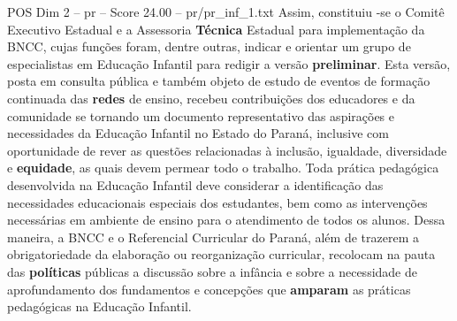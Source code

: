 \begin{textsample}{POS Dim 2 – pr – Score 24.00 – pr/pr\_inf\_1.txt}
Assim, constituiu -se o Comitê Executivo Estadual e a Assessoria \textbf{Técnica} Estadual para implementação da BNCC, cujas funções foram, dentre outras, indicar e orientar um grupo de especialistas em Educação Infantil para redigir a versão \textbf{preliminar}.
Esta versão, posta em consulta pública e também objeto de estudo de eventos de formação continuada das \textbf{redes} de ensino, recebeu contribuições dos educadores e da comunidade se tornando um documento representativo das aspirações e necessidades da Educação Infantil no Estado do Paraná, inclusive com oportunidade de rever as questões relacionadas à inclusão, igualdade, diversidade e \textbf{equidade}, as quais devem permear todo o trabalho.
Toda prática pedagógica desenvolvida na Educação Infantil deve considerar a identificação das necessidades educacionais especiais dos estudantes, bem como as intervenções necessárias em ambiente de ensino para o atendimento de todos os alunos.
Dessa maneira, a BNCC e o Referencial Curricular do Paraná, além de trazerem a obrigatoriedade da elaboração ou reorganização curricular, recolocam na pauta das \textbf{políticas} públicas a discussão sobre a infância e sobre a necessidade de aprofundamento dos fundamentos e concepções que \textbf{amparam} as práticas pedagógicas na Educação Infantil.

\end{textsample}
